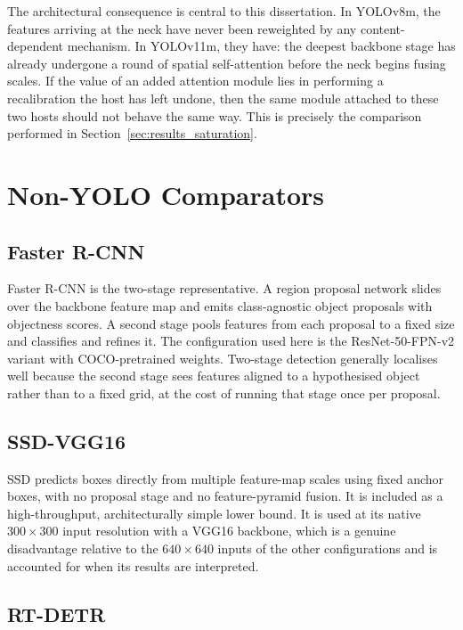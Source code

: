 \documentclass[MScCS]{uccthesis}
\begin{document}
The architectural consequence is central to this dissertation. In YOLOv8m, the
features arriving at the neck have never been reweighted by any
content-dependent mechanism. In YOLOv11m, they have: the deepest backbone
stage has already undergone a round of spatial self-attention before the neck
begins fusing scales. If the value of an added attention module lies in
performing a recalibration the host has left undone, then the same module
attached to these two hosts should not behave the same way. This is precisely
the comparison performed in Section~\ref{sec:results_saturation}.

\section{Non-YOLO Comparators}
\label{sec:non_yolo}

\subsection{Faster R-CNN}

Faster R-CNN \parencite{ren2015faster} is the two-stage representative. A
region proposal network slides over the backbone feature map and emits
class-agnostic object proposals with objectness scores. A second stage pools
features from each proposal to a fixed size and classifies and refines it. The
configuration used here is the ResNet-50-FPN-v2 variant with COCO-pretrained
weights. Two-stage detection generally localises well because the second stage
sees features aligned to a hypothesised object rather than to a fixed grid, at
the cost of running that stage once per proposal.

\subsection{SSD-VGG16}

SSD \parencite{liu2016ssd} predicts boxes directly from multiple feature-map
scales using fixed anchor boxes, with no proposal stage and no feature-pyramid
fusion. It is included as a high-throughput, architecturally simple lower
bound. It is used at its native $300 \times 300$ input resolution with a VGG16
backbone, which is a genuine disadvantage relative to the $640 \times 640$
inputs of the other configurations and is accounted for when its results are
interpreted.

\subsection{RT-DETR}
\end{document}
